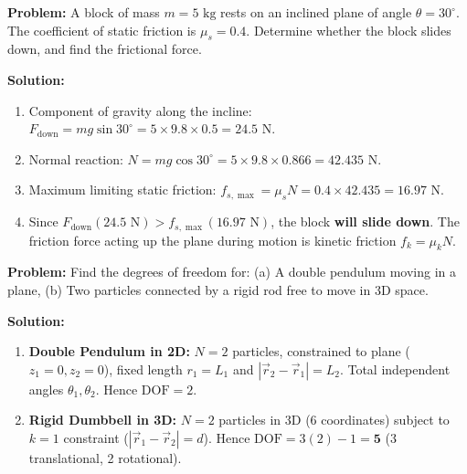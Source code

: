 \documentclass[12pt,a4paper]{article}
\begin{document}
\begin{tcolorbox}[examplebox, title={\textbf{Solved Problem 1: Block on an Inclined Plane with Friction}}]
\textbf{Problem:} A block of mass $m = 5\text{ kg}$ rests on an inclined plane of angle $\theta = 30^\circ$. The coefficient of static friction is $\mu_s = 0.4$. Determine whether the block slides down, and find the frictional force.

\textbf{Solution:}\par\noindent
\begin{enumerate}[leftmargin=*, itemsep=2pt]
  \item Component of gravity along the incline: $F_{\text{down}} = m g \sin 30^\circ = 5 \times 9.8 \times 0.5 = 24.5\text{ N}$.
  \item Normal reaction: $N = m g \cos 30^\circ = 5 \times 9.8 \times 0.866 = 42.435\text{ N}$.
  \item Maximum limiting static friction: $f_{s,\max} = \mu_s N = 0.4 \times 42.435 = 16.97\text{ N}$.
  \item Since $F_{\text{down}} (24.5\text{ N}) > f_{s,\max} (16.97\text{ N})$, the block \textbf{will slide down}. The friction force acting up the plane during motion is kinetic friction $f_k = \mu_k N$.
\end{enumerate}
\end{tcolorbox}

\begin{tcolorbox}[examplebox, title={\textbf{Solved Problem 2: Degrees of Freedom of Connected Bodies}}]
\textbf{Problem:} Find the degrees of freedom for: (a) A double pendulum moving in a plane, (b) Two particles connected by a rigid rod free to move in 3D space.

\textbf{Solution:}\par\noindent
\begin{enumerate}[leftmargin=*, itemsep=2pt]
  \item \textbf{Double Pendulum in 2D:} $N=2$ particles, constrained to plane ($z_1=0, z_2=0$), fixed length $r_1=L_1$ and $|\vec{r}_2-\vec{r}_1|=L_2$. Total independent angles $\theta_1, \theta_2$. Hence \textbf{$\text{DOF} = 2$}.
  \item \textbf{Rigid Dumbbell in 3D:} $N=2$ particles in 3D ($6$ coordinates) subject to $k=1$ constraint ($|\vec{r}_1 - \vec{r}_2| = d$). Hence $\text{DOF} = 3(2) - 1 = \mathbf{5}$ (3 translational, 2 rotational).
\end{enumerate}
\end{tcolorbox}
\end{document}
